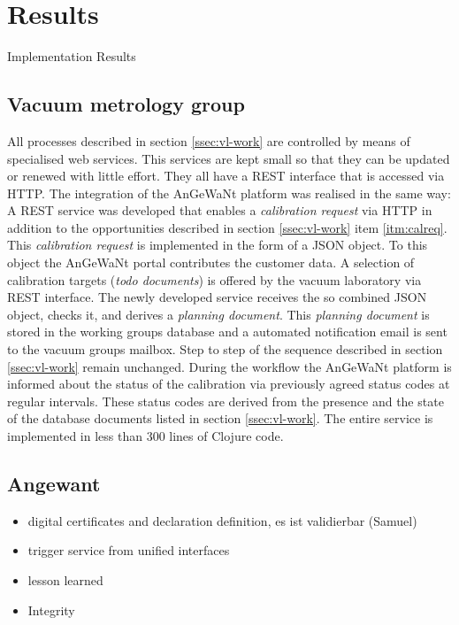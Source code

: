 \documentclass[3p,times,procedia]{elsarticle}
\begin{document}
\section{Results}
Implementation Results

\subsection{Vacuum metrology group}


All processes described in section \ref{ssec:vl-work} are controlled
by means of specialised web services. This services are kept small so
that they can be updated or renewed with little effort. They all have
a REST interface that is accessed via HTTP. The integration of the
AnGeWaNt platform was realised in the same way: A REST service was
developed that enables a \emph{calibration request} via HTTP in
addition to the opportunities described in section \ref{ssec:vl-work}
item \ref{itm:calreq}. This \emph{calibration request} is implemented
in the form of a JSON object. To this object the AnGeWaNt portal
contributes the customer data. A selection of calibration targets
(\emph{todo documents}) is offered by the vacuum laboratory via REST
interface. The newly developed service receives the so combined JSON
object, checks it, and derives a \emph{planning document}.  This
\emph{planning document} is stored in the working groups database and
a automated notification email is sent to the vacuum groups
mailbox. Step \label{itm:pla} to step \label{itm:last} of the sequence
described in section \ref{ssec:vl-work} remain unchanged. During the
workflow the AnGeWaNt platform is informed about the status of the
calibration via previously agreed status codes at regular
intervals. These status codes are derived from the presence and the
state of the database documents listed in section \ref{ssec:vl-work}.
The entire service is implemented in less than 300 lines of Clojure
code. %


\subsection{Angewant}
\begin{itemize}
    \item digital certificates and declaration %
      definition, es ist validierbar (Samuel)
    \item trigger service from unified interfaces %
    \item lesson learned %
    \item Integrity %
\end{itemize}
\end{document}
